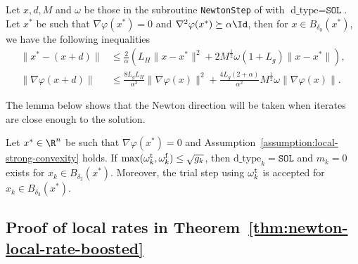\begin{lemma}
    \label{lem:gradient-decay-of-newton-step}
    Let $x, d, M$ and $\omega$ be those in the subroutine \texttt{NewtonStep} of  with $\text{d\_type} = \texttt{SOL}$.
    Let $x^*$ be such that $\nabla \varphi(x^*) = 0$ and $\nabla^2\varphi(x^*) \succeq \alpha\Id$, 
    then for $x \in B_{\delta_0}(x^*)$, 
    we have the following inequalities 
    \begin{align}
        \label{eqn:distance-decay-of-newton-step}
        \| x^* - (x + d) \|
        &\leq \frac{2}{\alpha}\left( L_H \| x - x^* \|^2 + 2M^{\frac{1}{2}}\omega (1 + L_g) \| x - x^* \| \right)
        ,
        \\
        \label{eqn:gradient-decay-of-newton-step}
        \| \nabla \varphi(x + d) \|
        &\leq \frac{8L_gL_H}{\alpha^3} \| \nabla \varphi(x) \|^2
        + \frac{4L_g(2 + \alpha)}{\alpha^2} M^{\frac{1}{2}} \omega \| \nabla \varphi(x) \|.
    \end{align}
\end{lemma}

The lemma below shows that the Newton direction will be taken when iterates are close enough to the solution.
\begin{lemma}
    \label{lem:asymptotic-newton-step}
    Let $x^* \in \R^n$ be such that $\nabla \varphi(x^*) = 0$ and Assumption~\ref{assumption:local-strong-convexity} holds. 
    If $\max(\omega_k^{\mathrm{t}}, \omega_k^{\mathrm{f}}) \leq \sqrt{g_k}$, then $\text{d\_type}_k = \texttt{SOL}$ and $m_k = 0$ exists for $x_k \in B_{\delta_2}(x^*)$.
    Moreover, the trial step using $\omega_k^{\mathrm{t}}$ is accepted for $x_k \in B_{\delta_3}(x^*)$.
\end{lemma}

\subsection{Proof of local rates in Theorem~\ref{thm:newton-local-rate-boosted}} \label{sec:appendix/proof-boosted-local-rates-theorem}

